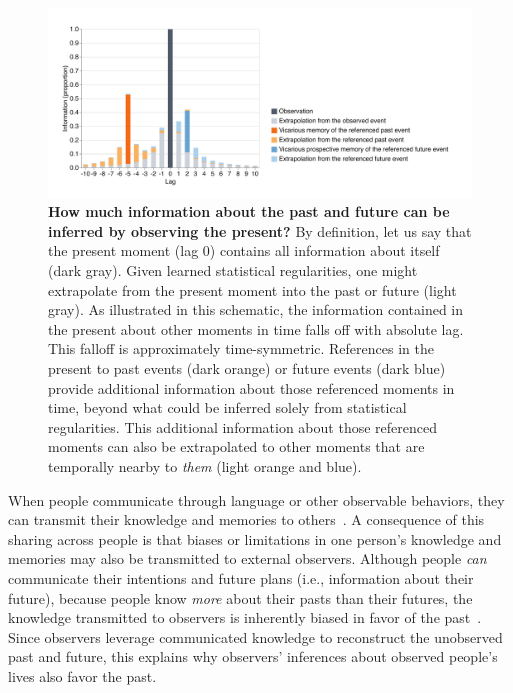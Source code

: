 \documentclass[10pt]{article}
\begin{document}
\begin{figure}[tp]
  \centering
  \includegraphics[width=\textwidth]{discussion}
  \caption{\textbf{How much information about the past and future can be inferred by observing the present?}  By definition, let us say that the present moment (lag 0) contains all information about itself (dark gray).  Given learned statistical regularities, one might extrapolate from the present moment into the past or future (light gray).  As illustrated in this schematic, the information contained in the present about other moments in time falls off with absolute lag.  This falloff is approximately time-symmetric.  References in the present to past events (dark orange) or future events (dark blue) provide additional information about those referenced moments in time, beyond what could be inferred solely from statistical regularities.  This additional information about those referenced moments can also be extrapolated to other moments that are temporally nearby to \textit{them} (light orange and blue).}
  \label{fig:discussion}
\end{figure}

When people communicate through language or other observable behaviors, they can transmit their knowledge and memories to others~\citep{HirsEcht12, MahrCsib18, Dess07, ZadbEtal17}.  A consequence of this sharing across people is that biases or limitations in one person's knowledge and memories may also be transmitted to external observers. Although people \textit{can} communicate their intentions and future plans (i.e., information about their future), because people know \textit{more} about their pasts than their futures, the knowledge transmitted to observers is inherently biased in favor of the past~\citep[Fig.~\ref{fig:discussion}; ][]{DemiEtal18}.  Since observers leverage communicated knowledge to reconstruct the unobserved past and future, this explains why observers' inferences about observed people's lives also favor the past.
\end{document}
